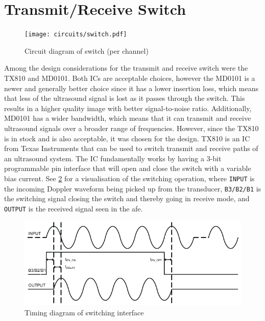 \section{Transmit/Receive Switch}
\begin{figure}[htbp]
	\centering
	\texttt{[image: circuits/switch.pdf]}
	\caption{Circuit diagram of switch (per channel)}
	\label{fig:3_switch}
\end{figure}
Among the design considerations for the transmit and receive switch were the TX810\cite{TX810} and MD0101\cite{MD0101}. Both ICs are acceptable choices, however the MD0101 is a newer and generally better choice since it has a lower insertion loss, which means that less of the ultrasound signal is lost as it passes through the switch. This results in a higher quality image with better signal-to-noise ratio. Additionally, MD0101 has a wider bandwidth, which means that it can transmit and receive ultrasound signals over a broader range of frequencies. However, since the TX810 is in stock and is also acceptable, it was chosen for the design. TX810 is an IC from Texas Instruments that can be used to switch transmit and receive paths of an ultrasound system. The IC fundamentally works by having a 3-bit programmable pin interface that will open and close the switch with a variable bias current. See \cref{fig:3_tx810_timing} for a visualisation of the switching operation, where \texttt{INPUT} is the incoming Doppler waveform being picked up from the transducer, \texttt{B3/B2/B1} is the switching signal closing the switch and thereby going in receive mode, and \texttt{OUTPUT} is the received signal seen in the \gls{afe}.
\begin{figure}[htbp]
	\centering
	\includegraphics[width=.8\textwidth]{Figures/3_tx810_timing.pdf}
	\caption{Timing diagram of switching interface}
	\label{fig:3_tx810_timing}
\end{figure}
